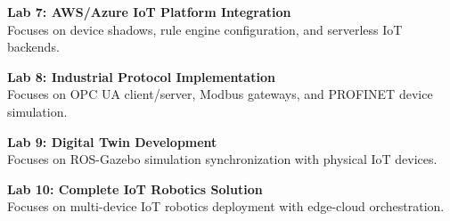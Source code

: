 \vspace{0.2cm}

\noindent\textbf{Lab 7: AWS/Azure IoT Platform Integration} \\
Focuses on device shadows, rule engine configuration, and serverless IoT backends.

\vspace{0.2cm}

\noindent\textbf{Lab 8: Industrial Protocol Implementation} \\
Focuses on OPC UA client/server, Modbus gateways, and PROFINET device simulation.

\vspace{0.2cm}

\noindent\textbf{Lab 9: Digital Twin Development} \\
Focuses on ROS-Gazebo simulation synchronization with physical IoT devices.

\vspace{0.2cm}

\noindent\textbf{Lab 10: Complete IoT Robotics Solution} \\
Focuses on multi-device IoT robotics deployment with edge-cloud orchestration.

\vspace{0.2cm}

\newpage
{}
